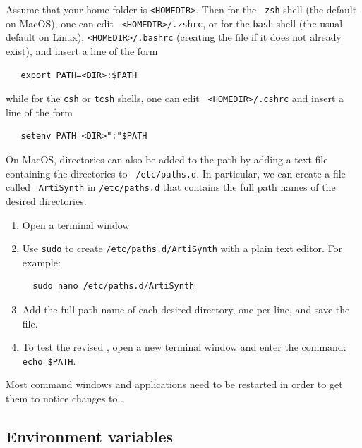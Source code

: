 Assume that your home folder is {\tt <HOMEDIR>}. Then for the {\tt
zsh} shell\ifMacOS{} (the default on MacOS)\fi, one can edit {\tt
<HOMEDIR>/.zshrc}, or for the {\tt bash} shell\ifLinux{} (the usual
default on Linux)\fi, {\tt <HOMEDIR>/.bashrc} (creating the file if it
does not already exist), and insert a line of the form
\begin{verbatim}
   export PATH=<DIR>:$PATH
\end{verbatim}
while for the {\tt csh} or {\tt tcsh} shells, one can edit {\tt
<HOMEDIR>/.cshrc} and insert a line of the form
\begin{verbatim}
   setenv PATH <DIR>":"$PATH
\end{verbatim}

\ifMacOS
On MacOS, directories can also be added to the
path by adding a text file containing the directories to {\tt
/etc/paths.d}.  In particular, we can create a file called {\tt
ArtiSynth} in {\tt /etc/paths.d} that contains the full path names of
the desired directories.

\begin{enumerate}

\item Open a terminal window

\item Use {\tt sudo} to create {\tt /etc/paths.d/ArtiSynth} with a plain
text editor. For example:
\begin{verbatim}
  sudo nano /etc/paths.d/ArtiSynth
\end{verbatim}

\item Add the full path name of each desired directory, one per line,
and save the file.

\item To test the revised \PATH{}, open a new terminal
window and enter the command: {\tt echo \$PATH}.

\end{enumerate}

\fi %
\fi %

\begin{sideblock}
Most command windows and applications need to be restarted in
order to get them to notice changes to \PATH{}.
\end{sideblock}

\subsection{Environment variables}
\label{EnvironmentVariables}

